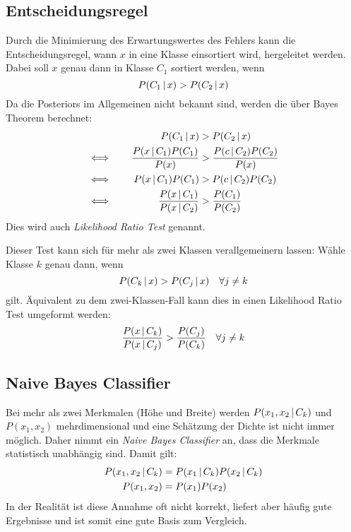 		\subsection{Entscheidungsregel}
			Durch die Minimierung des Erwartungswertes des Fehlers kann die Entscheidungsregel, wann \(x\) in eine Klasse einsortiert wird, hergeleitet werden. Dabei soll \(x\) genau dann in Klasse \(C_1\) sortiert werden, wenn
			\begin{equation*}
				P(C_1 \,\vert\, x) > P(C_2 \,\vert\, x)
			\end{equation*}
			Da die Posteriors im Allgemeinen nicht bekannt sind, werden die über Bayes Theorem berechnet:
			\begin{align*}
				               &  & P(C_1 \,\vert\, x)                         & > P(C_2 \,\vert\, x)                     &  \\
				\quad\iff\quad &  & \frac{P(x \,\vert\, C_1) P(C_1)}{P(x)}     & > \frac{P(c \,\vert\, C_2) P(C_2)}{P(x)} &  \\
				\quad\iff\quad &  & P(x \,\vert\, C_1) P(C_1)                  & > P(c \,\vert\, C_2) P(C_2)              &  \\
				\quad\iff\quad &  & \frac{P(x \,\vert\, C_1)}{P(x \,\vert\, C_2)} & > \frac{P(C_1)}{P(C_2)}               &
			\end{align*}
			Dies wird auch \emph{Likelihood Ratio Test} genannt.
			
			Dieser Test kann sich für mehr als zwei Klassen verallgemeinern lassen: Wähle Klasse \( k \) genau dann, wenn
			\begin{equation*}
				P(C_k \,\vert\, x) > P(C_j \,\vert\, x) \quad\forall j \neq k
			\end{equation*}
			gilt. Äquivalent zu dem zwei-Klassen-Fall kann dies in einen Likelihood Ratio Test umgeformt werden:
			\begin{equation*}
				\frac{P(x \,\vert\, C_k)}{P(x \,\vert\, C_j)} > \frac{P(C_j)}{P(C_k)} \quad\forall j \neq k
			\end{equation*}

		\subsection{Naive Bayes Classifier}
			Bei mehr als zwei Merkmalen (\zB Höhe und Breite) werden \( P(x_1, x_2 \,\vert\, C_k) \) und \( P(x_1, x_2) \) mehrdimensional und eine Schätzung der Dichte ist nicht immer möglich. Daher nimmt ein \emph{Naive Bayes Classifier} an, dass die Merkmale statistisch unabhängig sind. Damit gilt:
			\begin{align*}
				P(x_1, x_2 \,\vert\, C_k) & = P(x_1 \,\vert\, C_k) P(x_2 \,\vert\, C_k) \\
				P(x_1, x_2)            & = P(x_1) P(x_2)
			\end{align*}
			In der Realität ist diese Annahme oft nicht korrekt, liefert aber häufig gute Ergebnisse und ist somit eine gute Basis zum Vergleich.

